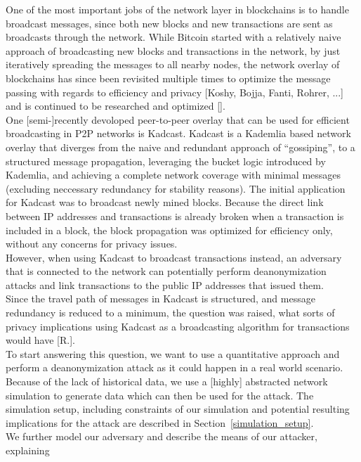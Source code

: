 One of the most important jobs of the network layer in blockchains is to handle broadcast messages, since
both new blocks and new transactions are sent as broadcasts through the network.
While Bitcoin started with a relatively naive approach of broadcasting
new blocks and transactions in the network, by just iteratively spreading the
messages to all nearby nodes,
the network overlay of blockchains has since been revisited multiple times to optimize the message passing with regards to efficiency and privacy [Koshy, Bojja, Fanti, Rohrer, ...] and is continued to be researched and optimized []. \\
One [semi-]recently devoloped peer-to-peer overlay that can be used for efficient broadcasting in P2P networks is Kadcast.
Kadcast is a Kademlia based network overlay that diverges from the naive
and redundant approach of ``gossiping'', to a structured message
propagation, leveraging the bucket logic introduced by Kademlia, and
achieving a complete network coverage with minimal messages (excluding
neccessary redundancy for stability reasons). %
The initial application for Kadcast was to broadcast newly mined blocks.
Because the direct link between IP addresses and transactions is already
broken when a transaction is included in a block, the block propagation
was optimized for efficiency only, without any concerns for privacy issues. \\
However, when using Kadcast to broadcast transactions instead, an adversary that is connected to the network can potentially perform
deanonymization attacks and link transactions to the public IP addresses that issued them. \\
Since the travel path of messages in Kadcast is structured, and message redundancy is reduced to a minimum, the question was raised, what sorts of privacy implications using Kadcast as a broadcasting algorithm for transactions would have [R.]. \\
To start answering this question, we want to use a quantitative approach and perform a deanonymization attack
as it could happen in a real world scenario. Because of the lack of historical data, we use a [highly] abstracted network
simulation to generate data which can then be used for the attack. The
simulation setup, including constraints of our simulation and potential
resulting implications for the attack are described in
Section~\ref{simulation_setup}. \\
We further model our adversary and describe the means of our attacker, explaining
